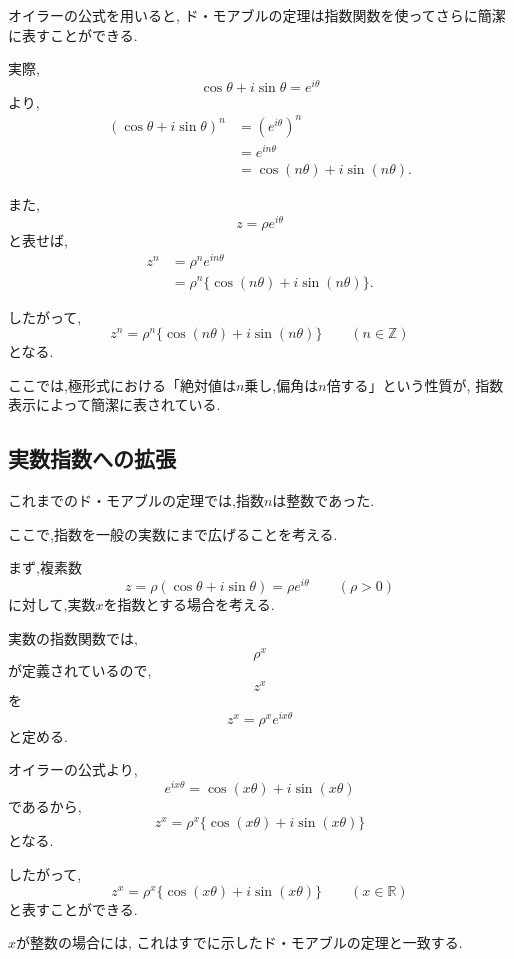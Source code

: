   オイラーの公式を用いると,
  ド・モアブルの定理は指数関数を使ってさらに簡潔に表すことができる.

  実際,
  \[
    \cos\theta+i\sin\theta
    =
    e^{i\theta}
  \]
  より,
  \begin{align*}
    (\cos\theta+i\sin\theta)^n
    &=
    (e^{i\theta})^n\\
    &=
    e^{in\theta}\\
    &=
    \cos(n\theta)+i\sin(n\theta).
  \end{align*}

  また,
  \[
    z
    =
    \rho e^{i\theta}
  \]
  と表せば,
  \begin{align*}
    z^n
    &=
    \rho^n e^{in\theta}\\
    &=
    \rho^n
    \{
      \cos(n\theta)+i\sin(n\theta)
    \}.
  \end{align*}

  したがって,
  \[
    z^n
    =
    \rho^n
    \{
      \cos(n\theta)+i\sin(n\theta)
    \}
    \qquad(n\in\mathbb Z)
  \]
  となる.

  ここでは,極形式における「絶対値は$n$乗し,偏角は$n$倍する」という性質が,
  指数表示によって簡潔に表されている.


\subsection{実数指数への拡張}

  これまでのド・モアブルの定理では,指数$n$は整数であった.

  ここで,指数を一般の実数にまで広げることを考える.

  まず,複素数
  \[
    z
    =
    \rho(
      \cos\theta+i\sin\theta
    )
    =
    \rho e^{i\theta}
    \qquad(\rho>0)
  \]
  に対して,実数$x$を指数とする場合を考える.

  実数の指数関数では,
  \[
    \rho^x
  \]
  が定義されているので,
  \[
    z^x
  \]
  を
  \[
    z^x
    =
    \rho^x e^{ix\theta}
  \]
  と定める.

  オイラーの公式より,
  \[
    e^{ix\theta}
    =
    \cos(x\theta)+i\sin(x\theta)
  \]
  であるから,
  \[
    z^x
    =
    \rho^x
    \{
      \cos(x\theta)+i\sin(x\theta)
    \}
  \]
  となる.

  したがって,
  \[
    z^x
    =
    \rho^x
    \{
      \cos(x\theta)+i\sin(x\theta)
    \}
    \qquad(x\in\mathbb R)
  \]
  と表すことができる.

  $x$が整数の場合には,
  これはすでに示したド・モアブルの定理と一致する.


